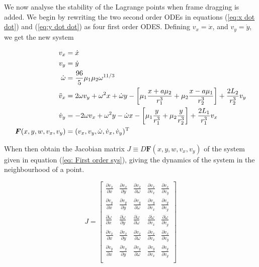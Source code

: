 \documentclass{article}
\begin{document}
We now analyse the stability of the Lagrange points when frame dragging is added. We begin by rewriting the two second order ODEs in equations (\ref{eq:x dot dot}) and (\ref{eq:y dot dot}) as four first order ODES. Defining $v_x=\dot{x}$, and $v_y=\dot{y}$, we get the new system 

\begin{align}
    v_x &= \dot{x}   \notag \\
    v_y &= \dot{y}   \notag \\
    \dot{\omega} &= \frac{96}{5} \mu_1 \mu_2 \omega^{11/3} \notag \\
    \ddot{v}_x &= 2 \omega v_y + \omega^2 x + \dot{\omega} y - \left[ \mu_1 \frac{x+a \mu_2}{r_1^3} + \mu_2 \frac{x-a \mu_1}{r_2^3} \right] + \frac{2 L_2}{r_2^3} v_y \notag \\
    \dot{v}_y &= -2 \omega v_x + \omega^2 y - \dot{\omega} x - \left[ \mu_1 \frac{y}{r_1^3} + \mu_2 \frac{y}{r_2^3} \right] + \frac{2 L_1}{r_1^3} v_x \notag\\
    \boldsymbol{F}(x,y,w,v_x,v_y) &= (v_x, v_y, \dot{\omega}, \dot{v}_x, \dot{v}_y)^{\mathrm{T}} \label{eq: First order sys}
\end{align}

When then obtain the Jacobian matrix $J \equiv D\boldsymbol{F}(x,y,w,v_x,v_y)$ of the system given in equation (\ref{eq: First order sys}), giving the dynamics of the system in the neighbourhood of a point.
    

\[
J = \begin{bmatrix}
    \frac{\partial v_x}{\partial x} & \frac{\partial v_x}{\partial y} & \frac{\partial v_x}{\partial \omega} & \frac{\partial v_x}{\partial v_x} & \frac{\partial v_x}{\partial v_y} \\
    \frac{\partial v_y}{\partial x} & \frac{\partial v_y}{\partial y} & \frac{\partial v_y}{\partial \omega} & \frac{\partial v_y}{\partial v_x} & \frac{\partial v_y}{\partial v_y} \\
    \frac{\partial \dot{\omega}}{\partial x} & \frac{\partial \dot{\omega}}{\partial y} & \frac{\partial \dot{\omega}}{\partial \omega} & \frac{\partial \dot{\omega}}{\partial v_x} & \frac{\partial \dot{\omega}}{\partial v_y} \\
    \frac{\partial \dot{v}_x}{\partial x} & \frac{\partial \dot{v}_x}{\partial y} & \frac{\partial \dot{v}_x}{\partial \omega} & \frac{\partial \dot{v}_x}{\partial v_x} & \frac{\partial \dot{v}_x}{\partial v_y} \\
    \frac{\partial \dot{v}_y}{\partial x} & \frac{\partial \dot{v}_y}{\partial y} & \frac{\partial \dot{v}_y}{\partial \omega} & \frac{\partial \dot{v}_y}{\partial v_x} & \frac{\partial \dot{v}_y}{\partial v_y} \\
\end{bmatrix}
\]
\end{document}
